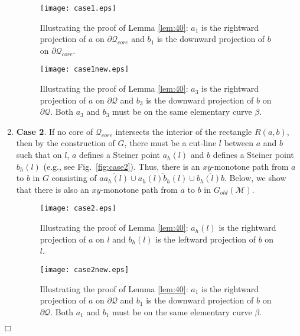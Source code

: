 \documentclass[english,runningheads,11pt]{llncs}
\def\calM{\mathcal{M}}
\def\calQ{\mathcal{Q}}
\newenvironment{proof}{\noindent {\textbf{Proof:}}\rm}{\hfill $\Box$\rm}
\begin{document}
\begin{proof}
\begin{enumerate}
\begin{figure}[t]
\begin{minipage}[t]{0.49\linewidth}
\begin{center}
\texttt{[image: case1.eps]}
\caption{\footnotesize Illustrating the proof of Lemma \ref{lem:40}:
$a_1$ is the rightward projection of $a$ on $\partial\calQ_{core}$ and $b_1$
is the downward projection of $b$ on $\partial\calQ_{core}$.}
\label{fig:case1}
\end{center}
\end{minipage}
\hspace*{0.04in}
\begin{minipage}[t]{0.49\linewidth}
\begin{center}
\texttt{[image: case1new.eps]}
\caption{\footnotesize Illustrating the proof of Lemma \ref{lem:40}:
$a_3$ is the rightward projection of $a$ on $\partial\calQ$ and $b_3$
is the downward projection of $b$ on $\partial\calQ$. Both $a_3$ and
$b_3$ must be on the same elementary curve $\beta$.}
\label{fig:case1new}
\end{center}
\end{minipage}
\vspace*{-0.15in}
\end{figure}

\item
{\bf Case 2}.
If no core of $\calQ_{core}$ intersects the interior of the rectangle
$R(a,b)$, then by the construction of $G$, there must be
a cut-line $l$ between $a$ and $b$ such that on $l$, $a$ defines a Steiner point
$a_h(l)$ and $b$ defines a Steiner point $b_h(l)$ (e.g., see
Fig.~\ref{fig:case2}). Thus, there is an
$xy$-monotone path from $a$ to $b$ in $G$ consisting of
$\overline{aa_h(l)}\cup
\overline{a_h(l)b_h(l)}\cup\overline{b_h(l)b}$. Below, we show that
there is also an $xy$-monotone path from $a$ to $b$ in
$G_{old}(\calM)$.


\begin{figure}[h]
\begin{minipage}[t]{0.49\linewidth}
\begin{center}
\texttt{[image: case2.eps]}
\caption{\footnotesize Illustrating the proof of Lemma \ref{lem:40}:
$a_h(l)$ is the rightward projection of $a$ on $l$ and $b_h(l)$
is the leftward projection of $b$ on $l$.}
\label{fig:case2}
\end{center}
\end{minipage}
\hspace*{0.04in}
\begin{minipage}[t]{0.49\linewidth}
\begin{center}
\texttt{[image: case2new.eps]}
\caption{\footnotesize Illustrating the proof of Lemma \ref{lem:40}:
$a_1$ is the rightward projection of $a$ on $\partial\calQ$ and $b_1$
is the downward projection of $b$ on $\partial\calQ$. Both $a_1$ and
$b_1$ must be on the same elementary curve $\beta$.}
\label{fig:case2new}
\end{center}
\end{minipage}
\vspace*{-0.15in}
\end{figure}


\end{enumerate}
\end{proof}
\end{document}
